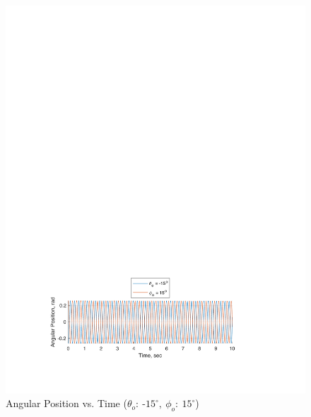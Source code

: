 \documentclass[12pt]{report}
\begin{document}
\begin{flushleft}
\begin{figure}[ht]
  \includegraphics[center]{2}
  \caption{Angular Position vs. Time ($\theta_o:~\textrm{-}15^\circ,~\phi_o:~15^\circ$)}
\end{figure}
\begin{figure}[ht]

\end{figure}
\end{flushleft}
\end{document}
